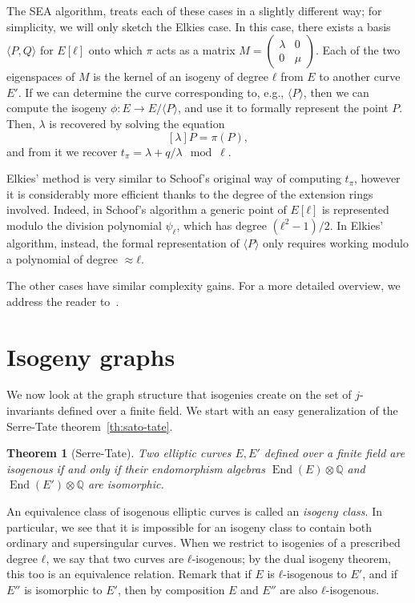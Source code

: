 \documentclass[10pt]{article}
\theoremstyle{plain}
\newtheorem{theorem}{Theorem}
\theoremstyle{definition}
\DeclareMathOperator{\End}{End} %
\begin{document}
The SEA algorithm, treats each of these cases in a slightly different
way; for simplicity, we will only sketch the Elkies case. %
In this case, there exists a basis $〈P,Q〉$ for $E[ℓ]$ onto which $π$
acts as a matrix
$M=\left(\begin{smallmatrix}λ&0\\0&μ\end{smallmatrix}\right)$. %
Each of the two eigenspaces of $M$ is the kernel of an isogeny of
degree $ℓ$ from $E$ to another curve $E'$. %
If we can determine the curve corresponding to, e.g., $〈P〉$, then we
can compute the isogeny $ϕ:E\to E/〈P〉$, and use it to formally
represent the point $P$. %
Then, $λ$ is recovered by solving the equation
\[[λ]P = π(P),\]
and from it we recover $t_π = λ + q/λ \mod \ell$.

Elkies' method is very similar to Schoof's original way of computing
$t_π$, however it is considerably more efficient thanks to the degree
of the extension rings involved. %
Indeed, in Schoof's algorithm a generic point of $E[ℓ]$ is represented
modulo the division polynomial $ψ_ℓ$, which has degree $(ℓ^2-1)/2$. %
In Elkies' algorithm, instead, the formal representation of $〈P〉$
only requires working modulo a polynomial of degree $≈ℓ$.

The other cases have similar complexity gains. %
For a more detailed overview, we address the reader
to~\cite{schoof95,lercier-algorithmique,elkies98,sutherland10}.

\section{Isogeny graphs}

We now look at the graph structure that isogenies create on the set of
$j$-invariants defined over a finite field. %
We start with an easy generalization of the Serre-Tate
theorem~\ref{th:sato-tate}.

\begin{theorem}[Serre-Tate]
  \label{th:sato-tate2}
  Two elliptic curves $E,E'$ defined over a finite field are isogenous
  if and only if their endomorphism algebras $\End(E)⊗ℚ$ and
  $\End(E')⊗ℚ$ are isomorphic.
\end{theorem}

An equivalence class of isogenous elliptic curves is called an
\emph{isogeny class}. %
In particular, we see that it is impossible for an isogeny class to
contain both ordinary and supersingular curves. %
When we restrict to isogenies of a prescribed degree $ℓ$, we say that
two curves are $ℓ$-isogenous; by the dual isogeny theorem, this too is
an equivalence relation. %
Remark that if $E$ is $ℓ$-isogenous to $E'$, and if $E''$ is
isomorphic to $E'$, then by composition $E$ and $E''$ are also
$ℓ$-isogenous. %
\end{document}
